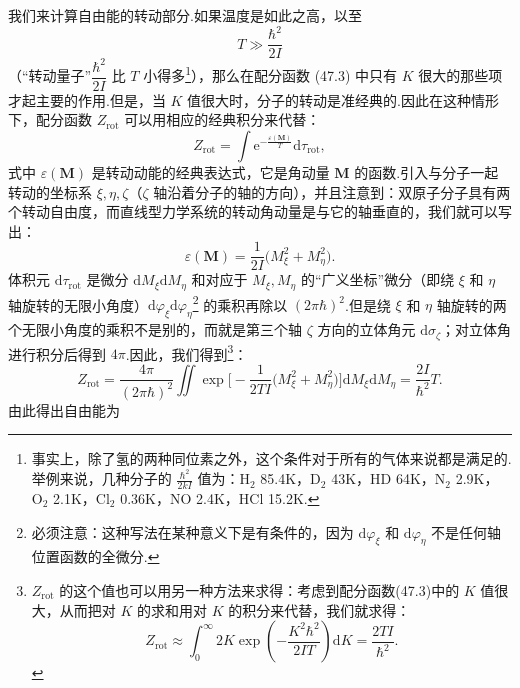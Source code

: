 我们来计算自由能的转动部分.如果温度是如此之高，以至
\begin{equation*}
  T\gg\frac{\hbar^2}{2I}
\end{equation*}
（“转动量子”$\dfrac{\hbar^2}{2I}$ 比 $T$ 小得多\footnote{事实上，除了氢的两种同位素之外，这个条件对于所有的气体来说都是满足的.举例来说，几种分子的 $\frac{\hbar^2}{2kI}$ 值为：$\mathrm{H}_2$ 85.4K，$\mathrm{D}_2$ 43K，HD 64K，$\mathrm{N}_2$ 2.9K，$\mathrm{O}_2$ 2.1K，$\mathrm{Cl}_2$ 0.36K，NO 2.4K，HCl 15.2K.}），那么在配分函数 (47.3) 中只有 $K$ 很大的那些项才起主要的作用.但是，当 $K$ 值很大时，分子的转动是准经典的.因此在这种情形下，配分函数 $Z_{\mathrm{rot}}$ 可以用相应的经典积分来代替：
\begin{equation}
  Z_{\mathrm{rot}}=\int\mathrm{e}^{-\frac{\varepsilon(\boldsymbol{M})}{T}}\mathrm{d}\tau_{\mathrm{rot}},
\end{equation}
式中 $\varepsilon(\boldsymbol{M})$ 是转动动能的经典表达式，它是角动量 $\boldsymbol{M}$ 的函数.引入与分子一起转动的坐标系 $\xi,\eta,\zeta$（$\zeta$ 轴沿着分子的轴的方向），并且注意到：双原子分子具有两个转动自由度，而直线型力学系统的转动角动量是与它的轴垂直的，我们就可以写出：
\begin{equation*}
  \varepsilon(\boldsymbol{M})=\frac{1}{2I}\big(M_{\xi}^2+M_{\eta}^2\big).
\end{equation*}
体积元 $\mathrm{d}\tau_{\mathrm{rot}}$ 是微分 $\mathrm{d}M_{\xi}\mathrm{d}M_{\eta}$ 和对应于 $M_{\xi},M_{\eta}$ 的“广义坐标”微分（即绕 $\xi$ 和 $\eta$ 轴旋转的无限小角度）$\mathrm{d}\varphi_{\xi}\mathrm{d}\varphi_{\eta}$\footnote{必须注意：这种写法在某种意义下是有条件的，因为 $\mathrm{d}\varphi_\xi$ 和 $\mathrm{d}\varphi_\eta$ 不是任何轴位置函数的全微分.} 的乘积再除以 $(2\pi\hbar)^2$.但是绕 $\xi$ 和 $\eta$ 轴旋转的两个无限小角度的乘积不是别的，而就是第三个轴 $\zeta$ 方向的立体角元 $\mathrm{d}\sigma_{\zeta}$；对立体角进行积分后得到 $4\pi$.因此，我们得到\footnote{$Z_{\mathrm{rot}}$ 的这个值也可以用另一种方法来求得：考虑到配分函数(47.3)中的 $K$ 值很大，从而把对 $K$ 的求和用对 $K$ 的积分来代替，我们就求得：
\begin{equation*}
  Z_{\mathrm{rot}}\approx\int_0^{\infty}2K\exp\left(-\frac{K^2\hbar^2}{2IT}\right)\mathrm{d}K=\frac{2TI}{\hbar^2}.
\end{equation*}}：
\begin{equation*}
  Z_{\mathrm{rot}}=\frac{4\pi}{(2\pi\hbar)^2}\iint
  \exp\Big[-\frac{1}{2TI}\big(M_{\xi}^2+M_{\eta}^2\big)\Big]
  \mathrm{d}M_{\xi}\mathrm{d}M_{\eta}=\frac{2I}{\hbar^2}T.
\end{equation*}
由此得出自由能为
